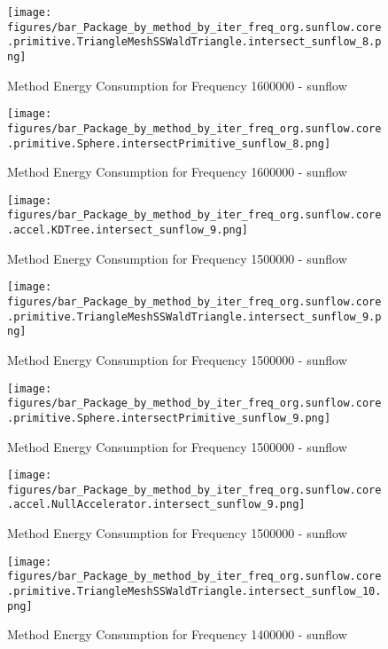 				\begin{figure}[H]
				\centering
				\texttt{[image: figures/bar\_Package\_by\_method\_by\_iter\_freq\_org.sunflow.core.primitive.TriangleMeshSSWaldTriangle.intersect\_sunflow\_8.png]}
				\caption{Method Energy Consumption for Frequency 1600000 - sunflow}				
				\end{figure}				
				
				\begin{figure}[H]
				\centering
				\texttt{[image: figures/bar\_Package\_by\_method\_by\_iter\_freq\_org.sunflow.core.primitive.Sphere.intersectPrimitive\_sunflow\_8.png]}
				\caption{Method Energy Consumption for Frequency 1600000 - sunflow}				
				\end{figure}				
				
				\begin{figure}[H]
				\centering
				\texttt{[image: figures/bar\_Package\_by\_method\_by\_iter\_freq\_org.sunflow.core.accel.KDTree.intersect\_sunflow\_9.png]}
				\caption{Method Energy Consumption for Frequency 1500000 - sunflow}				
				\end{figure}				
				
				\begin{figure}[H]
				\centering
				\texttt{[image: figures/bar\_Package\_by\_method\_by\_iter\_freq\_org.sunflow.core.primitive.TriangleMeshSSWaldTriangle.intersect\_sunflow\_9.png]}
				\caption{Method Energy Consumption for Frequency 1500000 - sunflow}				
				\end{figure}				
				
				\begin{figure}[H]
				\centering
				\texttt{[image: figures/bar\_Package\_by\_method\_by\_iter\_freq\_org.sunflow.core.primitive.Sphere.intersectPrimitive\_sunflow\_9.png]}
				\caption{Method Energy Consumption for Frequency 1500000 - sunflow}				
				\end{figure}				
				
				\begin{figure}[H]
				\centering
				\texttt{[image: figures/bar\_Package\_by\_method\_by\_iter\_freq\_org.sunflow.core.accel.NullAccelerator.intersect\_sunflow\_9.png]}
				\caption{Method Energy Consumption for Frequency 1500000 - sunflow}				
				\end{figure}				
				
				\begin{figure}[H]
				\centering
				\texttt{[image: figures/bar\_Package\_by\_method\_by\_iter\_freq\_org.sunflow.core.primitive.TriangleMeshSSWaldTriangle.intersect\_sunflow\_10.png]}
				\caption{Method Energy Consumption for Frequency 1400000 - sunflow}				
				\end{figure}				
				
